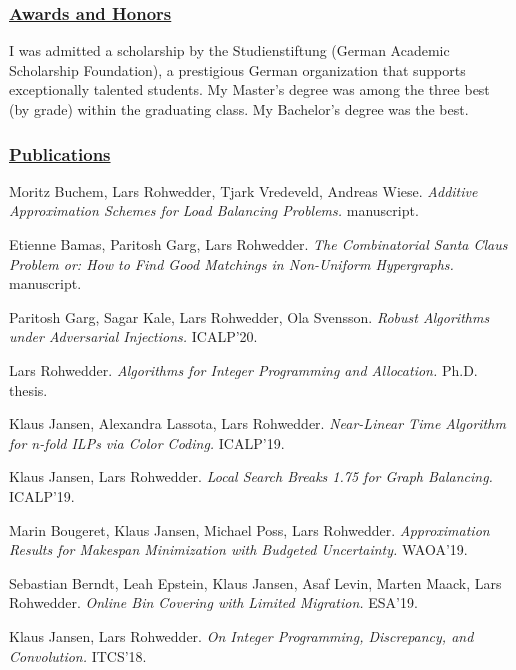 \documentclass{article}
\begin{document}
  

  \subsubsection*{\underline{Awards and Honors}}
    I was admitted a scholarship by the Studienstiftung (German Academic Scholarship Foundation), a prestigious German organization that supports exceptionally talented students.
My Master's degree was among the three best (by grade) within the graduating class. My Bachelor's degree was the best.


  \subsubsection*{\underline{Publications}}
  
     \noindent
     Moritz Buchem, Lars Rohwedder, Tjark Vredeveld, Andreas Wiese. {\it Additive Approximation Schemes for Load Balancing Problems.} manuscript. \medskip

  
     \noindent
     Etienne Bamas, Paritosh Garg, Lars Rohwedder. {\it The Combinatorial Santa Claus Problem or: How to Find Good Matchings in Non-Uniform Hypergraphs.} manuscript. \medskip

  
     \noindent
     Paritosh Garg, Sagar Kale, Lars Rohwedder, Ola Svensson. {\it Robust Algorithms under Adversarial Injections.} ICALP'20. \medskip

  
     \noindent
     Lars Rohwedder. {\it Algorithms for Integer Programming and Allocation.} Ph.D. thesis. \medskip

  
     \noindent
     Klaus Jansen, Alexandra Lassota, Lars Rohwedder. {\it Near-Linear Time Algorithm for n-fold ILPs via Color Coding.} ICALP'19. \medskip

  
     \noindent
     Klaus Jansen, Lars Rohwedder. {\it Local Search Breaks 1.75 for Graph Balancing.} ICALP'19. \medskip

  
     \noindent
     Marin Bougeret, Klaus Jansen, Michael Poss, Lars Rohwedder. {\it Approximation Results for Makespan Minimization with Budgeted Uncertainty.} WAOA'19. \medskip

  
     \noindent
     Sebastian Berndt, Leah Epstein, Klaus Jansen, Asaf Levin, Marten Maack, Lars Rohwedder. {\it Online Bin Covering with Limited Migration.} ESA'19. \medskip

  
     \noindent
     Klaus Jansen, Lars Rohwedder. {\it On Integer Programming, Discrepancy, and Convolution.} ITCS'18. \medskip
\end{document}
